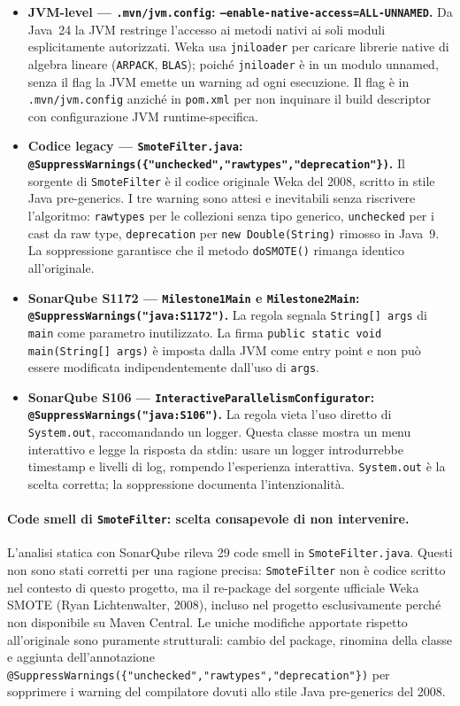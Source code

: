 \begin{itemize}
\item \textbf{JVM-level --- \texttt{.mvn/jvm.config}: \texttt{--enable-native-access=ALL-UNNAMED}.}
Da Java~24 la JVM restringe l'accesso ai metodi nativi ai soli moduli esplicitamente
autorizzati. Weka usa \texttt{jniloader} per caricare librerie native di algebra lineare
(\texttt{ARPACK}, \texttt{BLAS}); poiché \texttt{jniloader} è in un modulo unnamed,
senza il flag la JVM emette un warning ad ogni esecuzione. Il flag è in
\texttt{.mvn/jvm.config} anziché in \texttt{pom.xml} per non inquinare il build
descriptor con configurazione JVM runtime-specifica.

\item \textbf{Codice legacy --- \texttt{SmoteFilter.java}:
\texttt{@SuppressWarnings(\{"unchecked","rawtypes","deprecation"\})}.}
Il sorgente di \texttt{SmoteFilter} è il codice originale Weka del 2008, scritto in
stile Java pre-generics. I tre warning sono attesi e inevitabili senza riscrivere
l'algoritmo: \texttt{rawtypes} per le collezioni senza tipo generico, \texttt{unchecked}
per i cast da raw type, \texttt{deprecation} per \texttt{new Double(String)} rimosso in
Java~9. La soppressione garantisce che il metodo \texttt{doSMOTE()} rimanga identico
all'originale.

\item \textbf{SonarQube S1172 --- \texttt{Milestone1Main} e \texttt{Milestone2Main}:
\texttt{@SuppressWarnings("java:S1172")}.}
La regola segnala \texttt{String[] args} di \texttt{main} come parametro inutilizzato.
La firma \texttt{public static void main(String[] args)} è imposta dalla JVM come entry
point e non può essere modificata indipendentemente dall'uso di \texttt{args}.

\item \textbf{SonarQube S106 --- \texttt{InteractiveParallelismConfigurator}:
\texttt{@SuppressWarnings("java:S106")}.}
La regola vieta l'uso diretto di \texttt{System.out}, raccomandando un logger. Questa
classe mostra un menu interattivo e legge la risposta da stdin: usare un logger
introdurrebbe timestamp e livelli di log, rompendo l'esperienza interattiva.
\texttt{System.out} è la scelta corretta; la soppressione documenta l'intenzionalità.
\end{itemize}

\paragraph{Code smell di \texttt{SmoteFilter}: scelta consapevole di non intervenire.}
L'analisi statica con SonarQube rileva 29 code smell in \texttt{SmoteFilter.java}.
Questi non sono stati corretti per una ragione precisa: \texttt{SmoteFilter} non è
codice scritto nel contesto di questo progetto, ma il re-package del sorgente ufficiale
Weka SMOTE (Ryan Lichtenwalter, 2008), incluso nel progetto esclusivamente perché non
disponibile su Maven Central. Le uniche modifiche apportate rispetto all'originale sono
puramente strutturali: cambio del package, rinomina della classe e aggiunta dell'annotazione
\texttt{@SuppressWarnings(\{"unchecked","rawtypes","deprecation"\})} per sopprimere i
warning del compilatore dovuti allo stile Java pre-generics del 2008.

